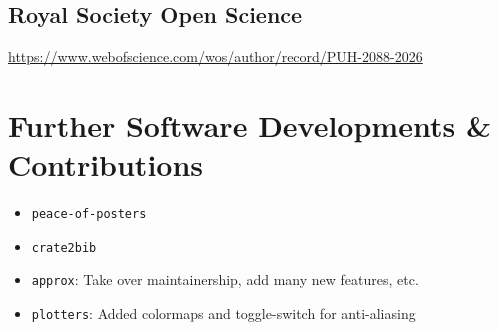 \vspace{0.5cm}

\subsection*{Royal Society Open Science}
\url{https://www.webofscience.com/wos/author/record/PUH-2088-2026}

\section*{Further Software Developments \& Contributions}
\begin{itemize}
    \item \texttt{peace-of-posters}
    \item \texttt{crate2bib}
    \item \texttt{approx}: Take over maintainership, add many new features, etc.
    \item \texttt{plotters}: Added colormaps and toggle-switch for anti-aliasing
\end{itemize}
